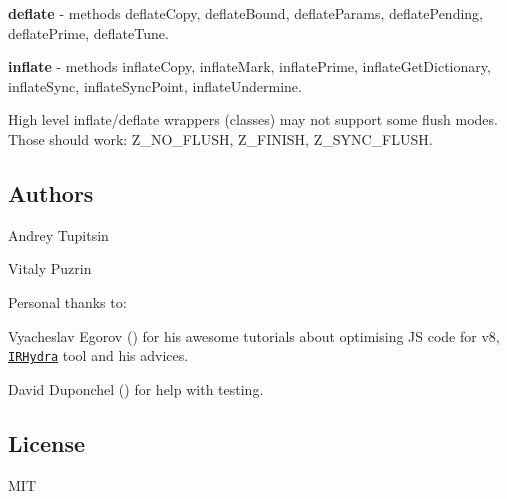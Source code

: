 \begin{DoxyItemize}
\item {\bfseries deflate} -\/ methods {\ttfamily deflate\+Copy}, {\ttfamily deflate\+Bound}, {\ttfamily deflate\+Params}, {\ttfamily deflate\+Pending}, {\ttfamily deflate\+Prime}, {\ttfamily deflate\+Tune}.
\item {\bfseries inflate} -\/ methods {\ttfamily inflate\+Copy}, {\ttfamily inflate\+Mark}, {\ttfamily inflate\+Prime}, {\ttfamily inflate\+Get\+Dictionary}, {\ttfamily inflate\+Sync}, {\ttfamily inflate\+Sync\+Point}, {\ttfamily inflate\+Undermine}.
\item High level inflate/deflate wrappers (classes) may not support some flush modes. Those should work\+: Z\+\_\+\+N\+O\+\_\+\+F\+L\+U\+SH, Z\+\_\+\+F\+I\+N\+I\+SH, Z\+\_\+\+S\+Y\+N\+C\+\_\+\+F\+L\+U\+SH.
\end{DoxyItemize}

\subsection*{Authors }


\begin{DoxyItemize}
\item Andrey Tupitsin \href{https://github.com/andr83}{\tt }
\item Vitaly Puzrin \href{https://github.com/puzrin}{\tt }
\end{DoxyItemize}

Personal thanks to\+:


\begin{DoxyItemize}
\item Vyacheslav Egorov (\href{https://github.com/mraleph}{\tt }) for his awesome tutorials about optimising JS code for v8, \href{http://mrale.ph/irhydra/}{\tt I\+R\+Hydra} tool and his advices.
\item David Duponchel (\href{https://github.com/dduponchel}{\tt }) for help with testing.
\end{DoxyItemize}

\subsection*{License }

M\+IT 